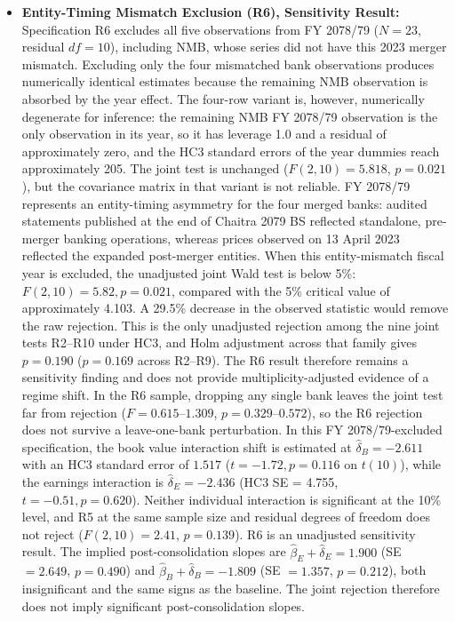 \begin{itemize}
    \item \textbf{Entity-Timing Mismatch Exclusion (R6), Sensitivity Result:} Specification R6 excludes all five observations from FY 2078/79 ($N = 23$, residual $df=10$), including NMB, whose series did not have this 2023 merger mismatch. Excluding only the four mismatched bank observations produces numerically identical estimates because the remaining NMB observation is absorbed by the year effect. The four-row variant is, however, numerically degenerate for inference: the remaining NMB FY 2078/79 observation is the only observation in its year, so it has leverage 1.0 and a residual of approximately zero, and the HC3 standard errors of the year dummies reach approximately 205. The joint test is unchanged ($F(2,10)=5.818$, $p=0.021$), but the covariance matrix in that variant is not reliable. FY 2078/79 represents an entity-timing asymmetry for the four merged banks: audited statements published at the end of Chaitra 2079 BS reflected standalone, pre-merger banking operations, whereas prices observed on 13 April 2023 reflected the expanded post-merger entities.
    When this entity-mismatch fiscal year is excluded, the unadjusted joint Wald test is below 5\%: $F(2, 10) = 5.82, p = 0.021$, compared with the 5\% critical value of approximately 4.103. A 29.5\% decrease in the observed statistic would remove the raw rejection. This is the only unadjusted rejection among the nine joint tests R2--R10 under HC3, and Holm adjustment across that family gives $p = 0.190$ ($p = 0.169$ across R2--R9). The R6 result therefore remains a sensitivity finding and does not provide multiplicity-adjusted evidence of a regime shift. In the R6 sample, dropping any single bank leaves the joint test far from rejection ($F = 0.615$--$1.309$, $p = 0.329$--$0.572$), so the R6 rejection does not survive a leave-one-bank perturbation.
    In this FY 2078/79-excluded specification, the book value interaction shift is estimated at $\hat{\delta}_B = -2.611$ with an HC3 standard error of $1.517$ ($t = -1.72, p = 0.116$ on $t(10)$), while the earnings interaction is $\hat{\delta}_E = -2.436$ (HC3 SE = 4.755, $t = -0.51, p = 0.620$). Neither individual interaction is significant at the 10\% level, and R5 at the same sample size and residual degrees of freedom does not reject ($F(2,10)=2.41$, $p=0.139$). R6 is an unadjusted sensitivity result. The implied post-consolidation slopes are $\hat{\beta}_E + \hat{\delta}_E = 1.900$ (SE $= 2.649$, $p = 0.490$) and $\hat{\beta}_B + \hat{\delta}_B = -1.809$ (SE $= 1.357$, $p = 0.212$), both insignificant and the same signs as the baseline. The joint rejection therefore does not imply significant post-consolidation slopes.

\end{itemize}
